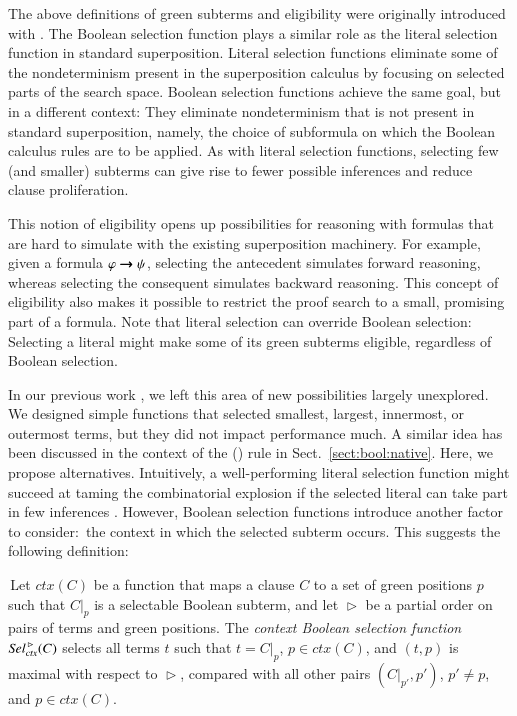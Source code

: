 The above definitions of green subterms and eligibility were originally introduced
with \osup{} \cite{bbtv-21-full-ho-sup}.
The Boolean selection function plays a similar role as the literal
selection function in standard superposition.
Literal selection functions eliminate some of the nondeterminism present in the superposition
calculus by focusing on selected parts of the search space. Boolean selection functions achieve
the same goal, but in a different context: They eliminate nondeterminism that is not
present in standard superposition, namely, the choice of subformula on which 
the Boolean calculus rules are to be applied. As with literal selection functions,
selecting few (and smaller) subterms can give rise to fewer possible inferences
and reduce clause proliferation.

%
This notion of eligibility opens up possibilities for reasoning with
formulas that are hard to simulate with the existing superposition machinery.
For example, given a formula $\varphi \pmb{\rightarrow} \psi$, selecting the antecedent
simulates forward reasoning, whereas selecting the consequent simulates backward
reasoning. This concept of eligibility also makes it possible to restrict the proof
search to a small, promising part of a formula. Note that
literal selection can override Boolean selection: Selecting a literal 
might make some of its green subterms eligible, regardless
of Boolean selection.

In our previous work \cite{nbtv-2021-foboolsup}, we left this area of new
possibilities largely unexplored. We designed simple functions that selected
smallest, largest, innermost, or outermost terms, but they did not impact
performance much. A similar idea has been discussed in the context of the () rule
in Sect.~\ref{sect:bool:native}.  Here, we propose alternatives.
%
Intuitively, a well-performing literal selection
function might succeed at taming the combinatorial explosion if the
selected literal can take part in few inferences
\cite{hrsv-16-selsel}. However, Boolean selection functions
introduce another factor to consider:\ the context in which the selected
subterm occurs. This suggests the following definition:

\begin{defi}
  \label{def:context-bool-sel}
  \,Let $\mathit{ctx}(C)$ be a function that maps a clause $C$ to a set of green positions
  $p$ such that $C|_p$ is a selectable Boolean subterm, and let
  $\vartriangleright$ be a partial order on pairs of terms and green positions.
  The \emph{context
  Boolean selection function} $\mathit{Sel\/}_{\mathit{ctx}}^{\,\vartriangleright}(C)$
  selects all terms $t$ such that $t=C|_p$, $p \in \mathit{ctx}(C)$, and
  $(t,p)$ is maximal with respect to $\vartriangleright$, compared with all other pairs $(C|_{p'}, p')$,
  $p' \neq p$, and $p \in \mathit{ctx}(C)$.
\end{defi}

